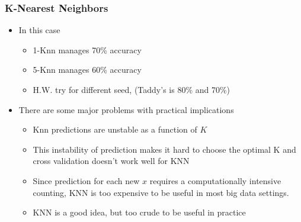 \documentclass[
  shownotes,
  xcolor={svgnames},
  hyperref={colorlinks,citecolor=DarkBlue,linkcolor=DarkRed,urlcolor=DarkBlue}
  , aspectratio=169]{beamer}
\begin{document}
\begin{frame}[fragile]
\frametitle{K-Nearest Neighbors}
\begin{itemize}
\item In this case
  \begin{itemize}
    \item 1-Knn manages 70\% accuracy
    \item 5-Knn manages 60\% accuracy
    \item H.W. try for different seed, (Taddy's is 80\% and 70\%)
  \end{itemize}
  \medskip
  \item There are some major problems with practical implications
  \begin{itemize}
  \item Knn predictions are unstable as a function of $K$
  \medskip
  \item This instability of prediction makes it hard to choose the optimal K and cross validation doesn't work well for KNN
  \medskip
  \item Since prediction for each new $x$ requires a computationally intensive counting, KNN is too expensive to be useful in most big data settings.
  \medskip
  \item KNN is a good idea, but too crude to be useful in practice
  \end{itemize}
\end{itemize}

\end{frame}
\end{document}
